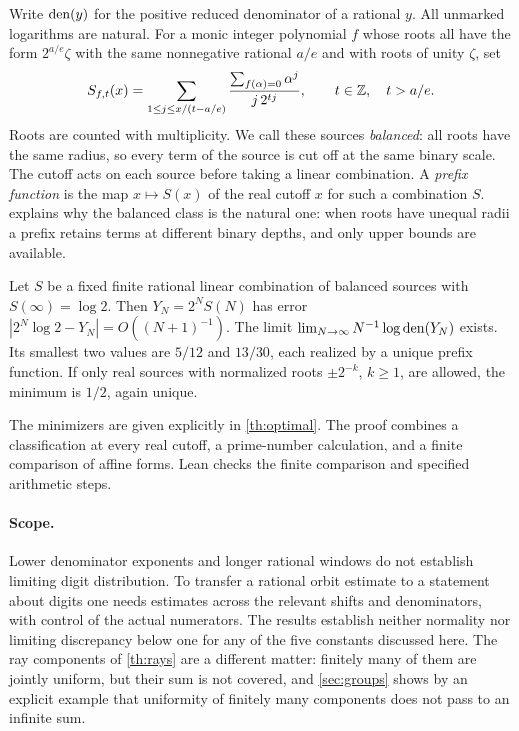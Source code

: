 \documentclass[11pt]{article}
\begin{document}
Write $\operatorname{den}(y)$ for the positive reduced denominator of a rational $y$. All unmarked logarithms are natural. For a monic integer polynomial $f$ whose roots all have the form $2^{a/e}\zeta$ with the same nonnegative rational $a/e$ and with roots of unity $\zeta$, set
\[
  S_{f,t}(x)=\sum_{1\le j\le x/(t-a/e)}
     \frac{\sum_{f(\alpha)=0}\alpha^j}{j\,2^{tj}},\qquad t\in\mathbb Z,\quad t>a/e .
\]
Roots are counted with multiplicity. We call these sources \emph{balanced}: all roots have the same radius, so every term of the source is cut off at the same binary scale. The cutoff acts on each source before taking a linear combination. A \emph{prefix function} is the map $x\mapsto S(x)$ of the real cutoff $x$ for such a combination $S$.  explains why the balanced class is the natural one: when roots have unequal radii a prefix retains terms at different binary depths, and only upper bounds are available.

\begin{maintheorem}\label{th:main}
Let $S$ be a fixed finite rational linear combination of balanced sources with $S(\infty)=\log 2$. Then $Y_N=2^NS(N)$ has error $|2^N\log 2-Y_N|=O((N+1)^{-1})$. The limit $\lim_{N\to\infty}N^{-1}\log\operatorname{den}(Y_N)$ exists. Its smallest two values are $5/12$ and $13/30$, each realized by a unique prefix function. If only real sources with normalized roots $\pm2^{-k}$, $k\ge1$, are allowed, the minimum is $1/2$, again unique.
\end{maintheorem}

The minimizers are given explicitly in \cref{th:optimal}. The proof combines a classification at every real cutoff, a prime-number calculation, and a finite comparison of affine forms. Lean checks the finite comparison and specified arithmetic steps.

\paragraph{Scope.} Lower denominator exponents and longer rational windows do not establish limiting digit distribution. To transfer a rational orbit estimate to a statement about digits one needs estimates across the relevant shifts and denominators, with control of the actual numerators. The results establish neither normality nor limiting discrepancy below one for any of the five constants discussed here. The ray components of \cref{th:rays} are a different matter: finitely many of them are jointly uniform, but their sum is not covered, and \cref{sec:groups} shows by an explicit example that uniformity of finitely many components does not pass to an infinite sum.
\end{document}
